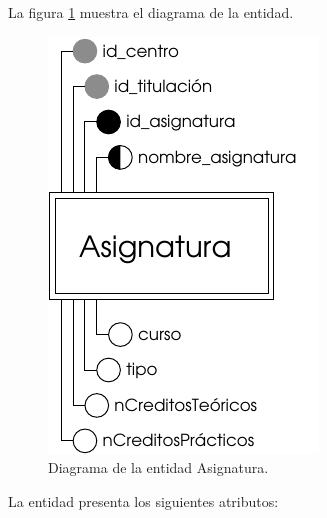 \begin{description}
   \item[Diagrama] La figura \ref{diagramaAsignatura} muestra el diagrama de la entidad.
   \item \begin{figure}[!ht]
            \begin{center}
            \includegraphics[]{07.Modelo_Entidad-Interrelacion/7.2.Analisis_Entidades/diagramas/asignatura.pdf}
            \caption{Diagrama de la entidad Asignatura.}
            \label{diagramaAsignatura}
            \end{center}
         \end{figure}

   \item[Descripción de los atributos] La entidad presenta los siguientes
   atributos:


\end{description}
